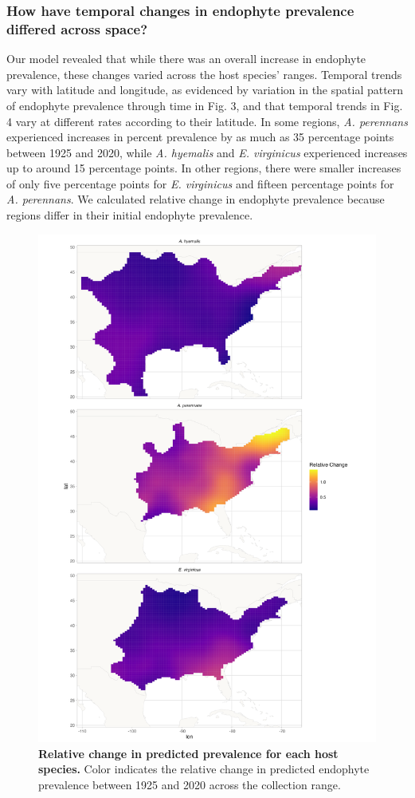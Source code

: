 \documentclass[11pt]{article}
\begin{document}
\subsubsection*{How have temporal changes in endophyte prevalence differed across space?}
Our model revealed that while there was an overall increase in endophyte prevalence, these changes varied across the host species' ranges.
Temporal trends vary with latitude and longitude, as evidenced by variation in the spatial pattern of endophyte prevalence through time in Fig. 3, and that temporal trends in Fig. 4 vary at different rates according to their latitude.
In some regions, \emph{A. perennans} experienced increases in percent prevalence by as much as 35 percentage points between 1925 and 2020, while \emph{A. hyemalis} and \emph{E. virginicus} experienced increases up to around 15 percentage points. 
In other regions, there were smaller increases of only five percentage points for \emph{E. virginicus} and fifteen percentage points for \emph{A. perennans}. 
We calculated relative change in endophyte prevalence because regions differ in their initial endophyte prevalence.

\begin{figure}[H]
	\label{fig:rel_change_plot}
	\centering
	\includegraphics[width = .8\linewidth]{rel_change_plot.png}
	\caption{\textbf{Relative change in predicted prevalence for each host species.} Color indicates the relative change in predicted endophyte prevalence between 1925 and 2020 across the collection range.}
\end{figure}
\end{document}

